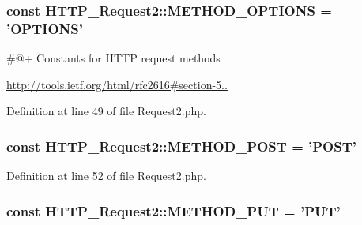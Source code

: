 \hypertarget{classHTTP__Request2_a65c57cec36149d220f6cd30d43eb59b7}{
\subsubsection[{M\-E\-T\-H\-O\-D\-\_\-\-O\-P\-T\-I\-O\-N\-S}]{\setlength{\rightskip}{0pt plus 5cm}const H\-T\-T\-P\-\_\-\-Request2\-::\-M\-E\-T\-H\-O\-D\-\_\-\-O\-P\-T\-I\-O\-N\-S = 'O\-P\-T\-I\-O\-N\-S'}}\label{classHTTP__Request2_a65c57cec36149d220f6cd30d43eb59b7}
\#@+ Constants for H\-T\-T\-P request methods

\hyperlink{}{http\-://tools.\-ietf.\-org/html/rfc2616\#section-\/5..}

Definition at line 49 of file Request2.\-php.

\hypertarget{classHTTP__Request2_ae42a6ae396ef8abacf8e54a64a64df22}{
\subsubsection[{M\-E\-T\-H\-O\-D\-\_\-\-P\-O\-S\-T}]{\setlength{\rightskip}{0pt plus 5cm}const H\-T\-T\-P\-\_\-\-Request2\-::\-M\-E\-T\-H\-O\-D\-\_\-\-P\-O\-S\-T = 'P\-O\-S\-T'}}\label{classHTTP__Request2_ae42a6ae396ef8abacf8e54a64a64df22}


Definition at line 52 of file Request2.\-php.

\hypertarget{classHTTP__Request2_a02fd90821d762476b8ec1e226c374174}{
\subsubsection[{M\-E\-T\-H\-O\-D\-\_\-\-P\-U\-T}]{\setlength{\rightskip}{0pt plus 5cm}const H\-T\-T\-P\-\_\-\-Request2\-::\-M\-E\-T\-H\-O\-D\-\_\-\-P\-U\-T = 'P\-U\-T'}}\label{classHTTP__Request2_a02fd90821d762476b8ec1e226c374174}


